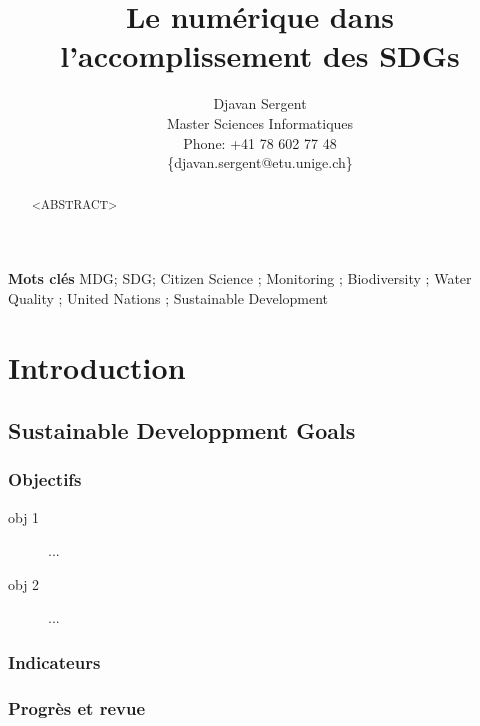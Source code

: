 \documentclass[10pt, conference, compsocconf]{llncs}
\begin{document}
%
\title{Le numérique dans\\l'accomplissement des SDGs}





% 
\author{Djavan Sergent \\
Master Sciences Informatiques \\
Phone: +41 78 602 77 48 \\
 \{djavan.sergent@etu.unige.ch\}}




\maketitle


\begin{abstract}
	<ABSTRACT>
\end{abstract}


\textbf{Mots clés}
MDG; SDG; Citizen Science ; Monitoring ; Biodiversity ; Water Quality ; United Nations ; Sustainable Development


\section{Introduction}\label{sec:introduction}

\subsection{Sustainable Developpment Goals}
\subsubsection{Objectifs}
\begin{description}
	\item[obj 1] ...
	\item[obj 2] ...
\end{description}
\subsubsection{Indicateurs}
\subsubsection{Progrès et revue}
\end{document}
